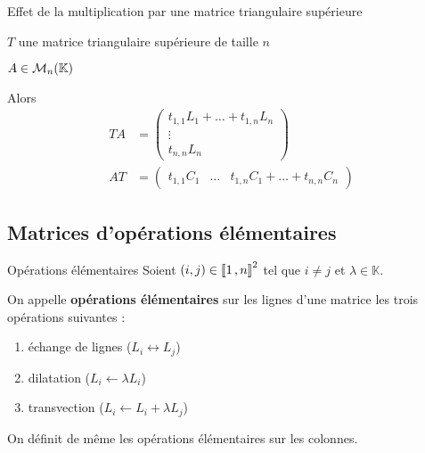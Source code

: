    \begin{prop}{Effet de la multiplication par une matrice triangulaire supérieure}{}
        \begin{soient}
            \item $T$ une matrice triangulaire supérieure de taille $n$
            \item $A \in \mathcal{M}_{n}(\mathbb{K})$
        \end{soient}

        Alors \begin{align*}
            TA & = \begin{pmatrix}
                t_{1,1} L_1 + \ldots + t_{1,n} L_n \\
                \vdots \\
                t_{n,n} L_n
            \end{pmatrix} \\
            AT & = \begin{pmatrix}
                t_{1,1} C_1 & \ldots & t_{1,n} C_1 + \ldots + t_{n,n} C_n  
            \end{pmatrix} 
        \end{align*}
    \end{prop}

\subsection{Matrices d’opérations élémentaires}

    \begin{defi}{Opérations élémentaires}{}
        Soient $(i,j) \in \left\llbracket 1 \, , n \right\rrbracket^2$ tel que $i \neq j$ et $\lambda \in \mathbb{K}$.

        On appelle \textbf{opérations élémentaires} sur les lignes d’une matrice les trois opérations suivantes :
        \begin{enumerate}
            \item échange de lignes ($L_i \leftrightarrow L_j$)
            \item dilatation ($L_i \leftarrow \lambda L_i$)
            \item transvection ($L_i \leftarrow L_i + \lambda L_j$)
        \end{enumerate}
        On définit de même les opérations élémentaires sur les colonnes.
    \end{defi}

